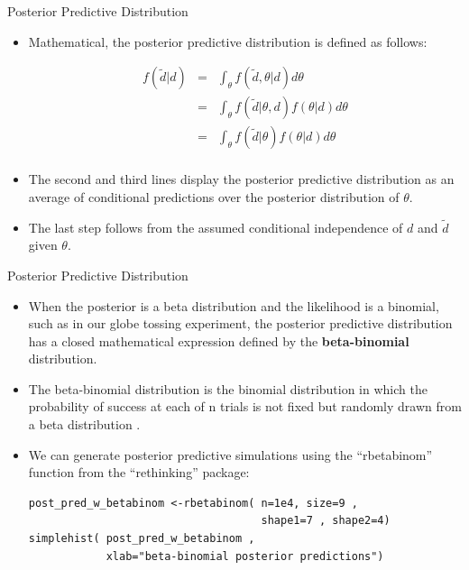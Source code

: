 \documentclass[handout]{beamer}
\begin{document}
\begin{frame}{Posterior Predictive Distribution}
\scriptsize{


\begin{itemize}
 
\item Mathematical, the posterior predictive distribution is defined as follows:

  \begin{eqnarray*}
 f(\tilde{d}|d) & = & \int_{\theta}f(\tilde{d},\theta|d)d\theta \\ 
                & = &  \int_{\theta}f(\tilde{d}|\theta,d)f(\theta|d)d\theta \\
                & = &  \int_{\theta}f(\tilde{d}|\theta)f(\theta|d)d\theta \\
 \end{eqnarray*}
 
 \item The second and third lines display the posterior predictive distribution as an average of conditional predictions over the posterior distribution of $\theta$.
 
 \item The last step follows from the assumed conditional independence of $d$ and $\tilde{d}$ given $\theta$.
 
 
 
\end{itemize}


} 
\end{frame}


\begin{frame}[fragile]{Posterior Predictive Distribution}
\scriptsize{


\begin{itemize}


\item When the posterior is a beta distribution and the likelihood is a binomial, such as in our globe tossing experiment, the posterior predictive distribution has a closed mathematical expression defined by the \textbf{beta-binomial} distribution.

\item The beta-binomial distribution is the binomial distribution in which the probability of success at each of n trials is not fixed but randomly drawn from a beta distribution \cite{wiki:Beta-binomial_distribution}.

\item We can generate posterior predictive simulations using the ``rbetabinom'' function from the ``rethinking'' package:

\begin{verbatim}
post_pred_w_betabinom <-rbetabinom( n=1e4, size=9 ,
                                    shape1=7 , shape2=4)
simplehist( post_pred_w_betabinom ,
            xlab="beta-binomial posterior predictions")
\end{verbatim}



\end{itemize}



}
\end{frame}
\end{document}
